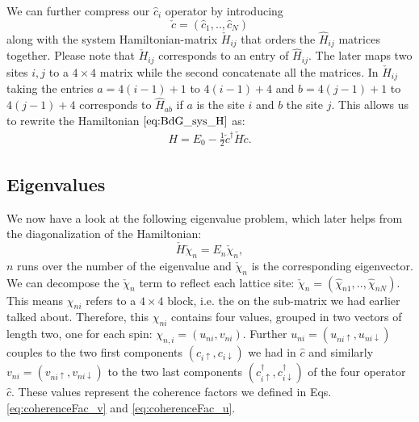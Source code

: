 \documentclass[../main.tex]{subfile}
\begin{document}
We can further compress our $\hat{c}_i$ operator by introducing 
\[
    \check{c} = (\hat{c}_1,..,\hat{c}_N)
\] 
along with the system Hamiltonian-matrix $\check{H}_{ij}$ that orders the $\hat{H}_{ij}$ matrices together.  
Please note that $\check{H}_{ij}$ corresponds to an entry of $\hat{H}_{ij}$. The later maps two sites $i,j$ to a $4\times4$ matrix while the second concatenate all the matrices.
In $\check{H}_{ij}$ taking the entries $a=4(i-1) + 1$ to $4(i-1) + 4$ and $b=4(j-1) + 1$ to $4(j-1) + 4$ corresponds to $\hat{H}_{ab}$ if $a$ is the site $i$ and $b$ the site $j$.
This allows us to rewrite the Hamiltonian $\ref{eq:BdG_sys_H}$ as:
\begin{align}
    H = E_0 - \frac{1}{2} \check{c}^\dagger \check{H} \check{c}.
\end{align}
\subsection{Eigenvalues}
We now have a look at the following eigenvalue problem, which later helps from the diagonalization of the Hamiltonian:
\begin{equation}
    \label{eq:BdG_eigenVal_H} 
    \check{H} \check{\chi}_n = E_n \check{\chi}_n,
\end{equation}
$n$ runs over the number of the eigenvalue and $\check{\chi}_n$ is the corresponding eigenvector.
We can decompose the $\check{\chi}_n$ term to reflect each lattice site: $\check{\chi}_n = (\hat{\chi}_{n1},..,\hat{\chi}_{nN})$. 
This means $\chi_{ni}$ refers to a $4\times4$ block, i.e. the on the sub-matrix we had earlier talked about.
Therefore, this $\chi_{ni}$ contains four values, grouped in two vectors of length two, one for each spin: $\chi_{n,i} = (u_{ni}, v_{ni})$.
Further $u_{ni} = (u_{ni\uparrow}, u_{ni\downarrow})$ couples to the two first components $(c_{i\uparrow},c_{i\downarrow})$ we had in $\hat{c}$ and 
similarly $v_{ni} = (v_{ni\uparrow}, v_{ni\downarrow})$ to the two last components $(c_{i\uparrow}^{\dagger},c_{i\downarrow}^{\dagger})$ of
the four operator $\hat{c}$. These values represent the coherence factors we defined in Eqs. \ref{eq:coherenceFac_v} and \ref{eq:coherenceFac_u}.\\ 
\end{document}
